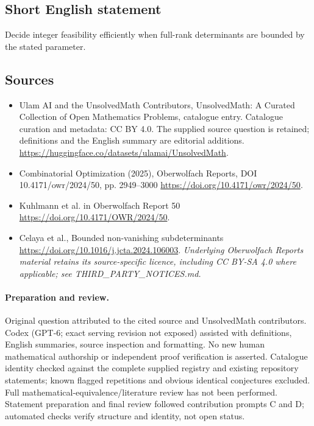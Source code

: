 \documentclass[11pt]{article}
\begin{document}
\subsection{Short English statement}
Decide integer feasibility efficiently when full-rank determinants are bounded by the stated parameter.
\subsection{Sources}
\begin{itemize}
\item[\hypertarget{source:statement:1}{S1}] Ulam AI and the UnsolvedMath Contributors, UnsolvedMath: A Curated Collection of Open Mathematics Problems, catalogue entry. Catalogue curation and metadata: CC BY 4.0. The supplied source question is retained; definitions and the English summary are editorial additions.
\url{https://huggingface.co/datasets/ulamai/UnsolvedMath}.
\item[\hypertarget{source:statement:2}{S2}] Combinatorial Optimization (2025), Oberwolfach Reports, DOI 10.4171/owr/2024/50, pp. 2949--3000
\url{https://doi.org/10.4171/owr/2024/50}.
\item[\hypertarget{source:statement:3}{S3}] Kuhlmann et al. in Oberwolfach Report 50
\url{https://doi.org/10.4171/OWR/2024/50}.
\item[\hypertarget{source:statement:4}{S4}] Celaya et al., Bounded non-vanishing subdeterminants
\url{https://doi.org/10.1016/j.jcta.2024.106003}.
\textit{Underlying Oberwolfach Reports material retains its source-specific licence, including CC BY-SA 4.0 where applicable; see THIRD\_PARTY\_NOTICES.md.}
\end{itemize}
\paragraph{Preparation and review.}
Original question attributed to the cited source and UnsolvedMath contributors. Codex (GPT-6; exact serving revision not exposed) assisted with definitions, English summaries, source inspection and formatting. No new human mathematical authorship or independent proof verification is asserted. Catalogue identity checked against the complete supplied registry and existing repository statements; known flagged repetitions and obvious identical conjectures excluded. Full mathematical-equivalence/literature review has not been performed. Statement preparation and final review followed contribution prompts C and D; automated checks verify structure and identity, not open status.
\label{end:statement}
\end{document}

